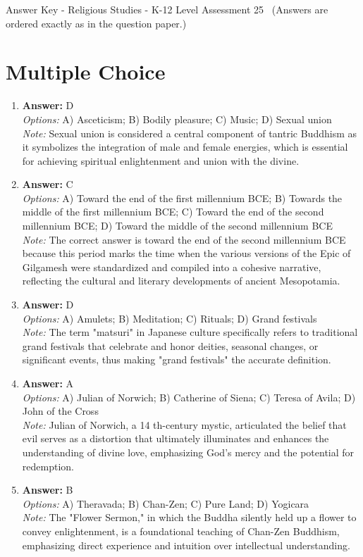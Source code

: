 \documentclass[12pt]{article}
\begin{document}
\begin{center}
Answer Key - Religious Studies - K-12 Level Assessment 25 \
\small (Answers are ordered exactly as in the question paper.)
\end{center}

\section*{Multiple Choice}
\begin{enumerate}[label=\arabic*.]
\item \textbf{Answer:} D
\\ \textit{Options:} A) Asceticism; B) Bodily pleasure; C) Music; D) Sexual union
\\ \textit{Note:} Sexual union is considered a central component of tantric Buddhism as it symbolizes the integration of male and female energies, which is essential for achieving spiritual enlightenment and union with the divine.
\item \textbf{Answer:} C
\\ \textit{Options:} A) Toward the end of the first millennium BCE; B) Towards the middle of the first millennium BCE; C) Toward the end of the second millennium BCE; D) Toward the middle of the second millennium BCE
\\ \textit{Note:} The correct answer is toward the end of the second millennium BCE because this period marks the time when the various versions of the Epic of Gilgamesh were standardized and compiled into a cohesive narrative, reflecting the cultural and literary developments of ancient Mesopotamia.
\item \textbf{Answer:} D
\\ \textit{Options:} A) Amulets; B) Meditation; C) Rituals; D) Grand festivals
\\ \textit{Note:} The term "matsuri" in Japanese culture specifically refers to traditional grand festivals that celebrate and honor deities, seasonal changes, or significant events, thus making "grand festivals" the accurate definition.
\item \textbf{Answer:} A
\\ \textit{Options:} A) Julian of Norwich; B) Catherine of Siena; C) Teresa of Avila; D) John of the Cross
\\ \textit{Note:} Julian of Norwich, a 14 th-century mystic, articulated the belief that evil serves as a distortion that ultimately illuminates and enhances the understanding of divine love, emphasizing God's mercy and the potential for redemption.
\item \textbf{Answer:} B
\\ \textit{Options:} A) Theravada; B) Chan-Zen; C) Pure Land; D) Yogicara
\\ \textit{Note:} The "Flower Sermon," in which the Buddha silently held up a flower to convey enlightenment, is a foundational teaching of Chan-Zen Buddhism, emphasizing direct experience and intuition over intellectual understanding.
\end{enumerate}
\end{document}
